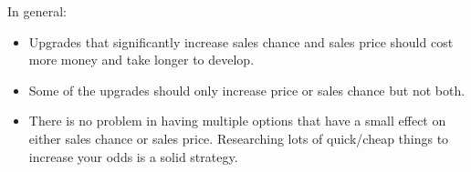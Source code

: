 \documentclass[a4paper]{article}
\begin{document}
In general:
\begin{itemize}
    \item Upgrades that significantly increase sales chance and sales price should cost more money and take longer to develop.
    \item Some of the upgrades should only increase price or sales chance but not both.
    \item There is no problem in having multiple options that have a small effect on either sales chance or sales price. Researching lots of quick/cheap things to increase your odds is a solid strategy.
\end{itemize}
\end{document}

